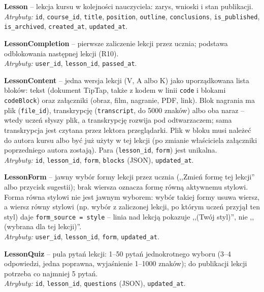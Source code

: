 \vspace{0.5em}
\textbf{Lesson} -- lekcja kursu w kolejności nauczyciela: zarys, wnioski i stan publikacji. \\
\textit{Atrybuty:} \texttt{id}, \texttt{course\_id}, \texttt{title}, \texttt{position}, \texttt{outline}, \texttt{conclusions}, \texttt{is\_published}, \texttt{is\_archived}, \texttt{created\_at}, \texttt{updated\_at}.

\vspace{0.5em}
\textbf{LessonCompletion} -- pierwsze zaliczenie lekcji przez ucznia; podstawa odblokowania następnej lekcji (R10). \\
\textit{Atrybuty:} \texttt{user\_id}, \texttt{lesson\_id}, \texttt{passed\_at}.

\vspace{0.5em}
\textbf{LessonContent} -- jedna wersja lekcji (V, A albo K) jako uporządkowana lista bloków: tekst (dokument TipTap, także z kodem w linii \texttt{code} i blokami \texttt{codeBlock}) oraz załączniki (obraz, film, nagranie, PDF, link). Blok nagrania ma plik (\texttt{file\_id}), transkrypcję (\texttt{transcript}, do 5000 znaków) albo oba naraz -- wtedy uczeń słyszy plik, a transkrypcję rozwija pod odtwarzaczem; sama transkrypcja jest czytana przez lektora przeglądarki. Plik w bloku musi należeć do autora kursu albo być już użyty w tej lekcji (po zmianie właściciela załączniki poprzedniego autora zostają). Para (\texttt{lesson\_id}, \texttt{form}) jest unikalna. \\
\textit{Atrybuty:} \texttt{id}, \texttt{lesson\_id}, \texttt{form}, \texttt{blocks} (JSON), \texttt{updated\_at}.

\vspace{0.5em}
\textbf{LessonForm} -- jawny wybór formy lekcji przez ucznia (,,Zmień formę tej lekcji'' albo przycisk sugestii); brak wiersza oznacza formę równą aktywnemu stylowi. Forma równa stylowi nie jest jawnym wyborem: wybór takiej formy usuwa wiersz, a wiersz równy stylowi (np. wybór z zaliczonej lekcji, po którym uczeń przyjął ten styl) daje \texttt{form\_source = style} -- linia nad lekcją pokazuje ,,(Twój styl)'', nie ,,(wybrana dla tej lekcji)''. \\
\textit{Atrybuty:} \texttt{user\_id}, \texttt{lesson\_id}, \texttt{form}, \texttt{updated\_at}.

\vspace{0.5em}
\textbf{LessonQuiz} -- pula pytań lekcji: 1--50 pytań jednokrotnego wyboru (3--4 odpowiedzi, jedna poprawna, wyjaśnienie 1--1000 znaków); do publikacji lekcji potrzeba co najmniej 5 pytań. \\
\textit{Atrybuty:} \texttt{id}, \texttt{lesson\_id}, \texttt{questions} (JSON), \texttt{updated\_at}.

